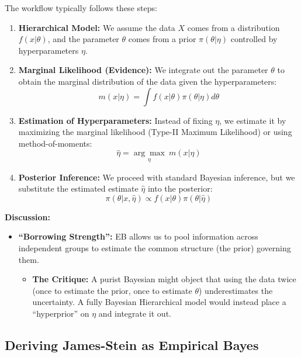 \documentclass[
  letterpaper,
  DIV=11,
  numbers=noendperiod]{scrreprt}
\providecommand{\tightlist}{%
  \setlength{\itemsep}{0pt}\setlength{\parskip}{0pt}}
\renewcommand{\[}{\begin{equation}}
\renewcommand{\]}{\end{equation}}
\theoremstyle{definition}
\theoremstyle{plain}
\theoremstyle{plain}
\theoremstyle{plain}
\theoremstyle{definition}
\theoremstyle{plain}
\theoremstyle{remark}
\begin{document}
The workflow typically follows these steps:

\begin{enumerate}
\def\labelenumi{\arabic{enumi}.}
\item
  \textbf{Hierarchical Model:} We assume the data \(X\) comes from a
  distribution \(f(x|\theta)\), and the parameter \(\theta\) comes from
  a prior \(\pi(\theta|\eta)\) controlled by hyperparameters \(\eta\).
\item
  \textbf{Marginal Likelihood (Evidence):} We integrate out the
  parameter \(\theta\) to obtain the marginal distribution of the data
  given the hyperparameters:
  \[m(x|\eta) = \int f(x|\theta) \pi(\theta|\eta) d\theta\]
\item
  \textbf{Estimation of Hyperparameters:} Instead of fixing \(\eta\), we
  estimate it by maximizing the marginal likelihood (Type-II Maximum
  Likelihood) or using method-of-moments:
  \[\hat{\eta} = \underset{\eta}{\arg\max} \ m(x|\eta)\]
\item
  \textbf{Posterior Inference:} We proceed with standard Bayesian
  inference, but we substitute the estimated estimate \(\hat{\eta}\)
  into the posterior:
  \[\pi(\theta|x, \hat{\eta}) \propto f(x|\theta) \pi(\theta|\hat{\eta})\]
\end{enumerate}

\textbf{Discussion:}

\begin{itemize}
\tightlist
\item
  \textbf{``Borrowing Strength'':} EB allows us to pool information
  across independent groups to estimate the common structure (the prior)
  governing them.

  \begin{itemize}
  \tightlist
  \item
    \textbf{The Critique:} A purist Bayesian might object that using the
    data twice (once to estimate the prior, once to estimate \(\theta\))
    underestimates the uncertainty. A fully Bayesian Hierarchical model
    would instead place a ``hyperprior'' on \(\eta\) and integrate it
    out.
  \end{itemize}
\end{itemize}

\subsection{Deriving James-Stein as Empirical
Bayes}\label{deriving-james-stein-as-empirical-bayes}
\end{document}
